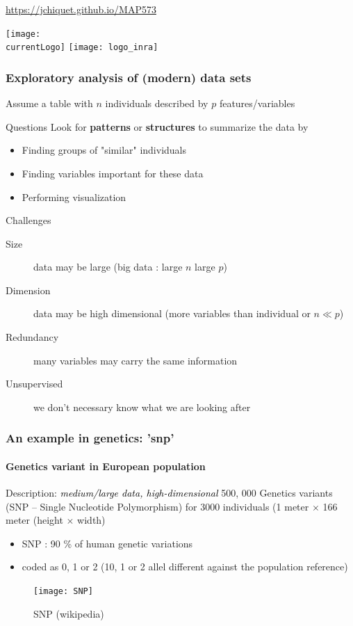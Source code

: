 \documentclass{beamer}\usepackage[]{graphicx}\usepackage[]{color}
\title{\currentCourse}
\subtitle{\huge\currentChapter\normalsize}
\institute{\currentInstitute}
\date{\currentDate}
\def\currentLogo{../common_figs/logo_X}
\newcommand{\dotitlepage}{%
  \begin{frame}
    \titlepage
    \vfill
    \begin{center}
        \scriptsize\url{https://jchiquet.github.io/MAP573}
    \end{center}
    \vfill
    \texttt{[image: \\currentLogo]}\hfill
    \texttt{[image: logo\_inra]}
  \end{frame}
}
\begin{document}
\dotitlepage

\begin{frame}
  \frametitle{Exploratory analysis of (modern) data sets}

  Assume a table with $n$ individuals described by $p$ features/variables
  
  \vfill
  
  \begin{block}{Questions}
    Look for \alert{\bf patterns} or \alert{\bf structures} to summarize the data by
    \begin{itemize}
      \item Finding \alert{groups} of "similar" individuals
      \item Finding variables \alert{important} for these data
      \item Performing \alert{visualization}
    \end{itemize}
  \end{block}

  \vfill

  \begin{block}{Challenges}
    \begin{description}
      \item[Size] data may be \alert{large} (\og big data \og: large $n$ large $p$)    
      \item[Dimension] data may be \alert{high dimensional} (more variables than individual or $n \ll p$)    
      \item[Redundancy] many variables may carry the \alert{same information}
      \item[Unsupervised] we \alert{don't necessary know} what we are looking after
    \end{description}
  \end{block}

\end{frame}

\begin{frame}[fragile]
  \frametitle{An example in genetics: 'snp'}
  \framesubtitle{Genetics variant in European population}

\begin{block}{Description: \textcolor{black}{\it medium/large data, high-dimensional}}
500, 000 Genetics variants (SNP -- Single Nucleotide Polymorphism) for  3000 individuals
(1 meter $\times$ 166 meter (height $\times$ width)
\end{block}

\begin{multicols}{2}
  \begin{itemize}
  \item SNP : 90 \% of human genetic variations
  \item coded as 0, 1 or 2 (10, 1 or 2 allel different against the population reference)
  \end{itemize}

  \begin{figure}
    \centering
     \texttt{[image: SNP]}   
    \caption{SNP (wikipedia)}
  \end{figure}
\end{multicols}

\end{frame}
\end{document}
